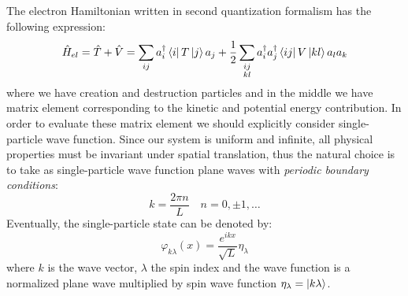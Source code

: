\documentclass[11pt, a4paper, twoside, openright]{article}
\begin{document}
The electron Hamiltonian written in second quantization formalism has the following expression:
\begin{equation*}
  \hat{H}_{el} = \hat{T}+\hat{V}= \sum_{ij}^{}a_i ^\dag \bra{i}T \ket{j}a_j + \frac{1}{2} \sum_{\substack{ij \\ kl} }^{} a_i ^\dag a_j ^\dag \bra{ij}V \ket{kl} a_l a_k
\end{equation*}
where we have creation and destruction particles and in the middle we have matrix element corresponding to the kinetic and potential energy contribution.
In order to evaluate these matrix element we should explicitly consider single-particle wave function.
Since our system is uniform and infinite, all physical properties must be invariant under spatial translation, thus the natural choice is to take as single-particle wave function plane waves with \emph{periodic boundary conditions}:
\begin{equation*}
  k = \frac{2 \pi n}{L} \quad n=0,\pm1,\dots
\end{equation*}
Eventually, the single-particle state can be denoted by:
\begin{equation}
  \varphi_{k \lambda } (x) = \frac{e^{i kx} }{\sqrt{L} } \eta _ \lambda
\end{equation}
 where \( k \) is the wave vector, \( \lambda  \) the spin index and the wave function is a normalized plane wave multiplied by spin wave function \( \eta _ \lambda = \ket{k \lambda }  \).
\end{document}
